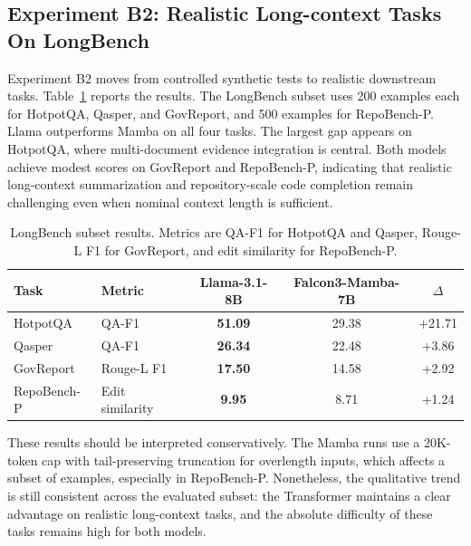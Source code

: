 \documentclass{article}
\begin{document}
\subsection{Experiment B2: Realistic Long-context Tasks On LongBench}
Experiment B2 moves from controlled synthetic tests to realistic downstream tasks. Table~\ref{tab:expb-longbench} reports the results. The LongBench subset uses 200 examples each for HotpotQA, Qasper, and GovReport, and 500 examples for RepoBench-P. Llama outperforms Mamba on all four tasks. The largest gap appears on HotpotQA, where multi-document evidence integration is central. Both models achieve modest scores on GovReport and RepoBench-P, indicating that realistic long-context summarization and repository-scale code completion remain challenging even when nominal context length is sufficient.

\begin{table}[t]
\centering
\begin{tabular}{llccc}
\toprule
Task & Metric & Llama-3.1-8B & Falcon3-Mamba-7B & $\Delta$ \\
\midrule
HotpotQA    & QA-F1           & \textbf{51.09} & 29.38 & +21.71 \\
Qasper      & QA-F1           & \textbf{26.34} & 22.48 & +3.86 \\
GovReport   & Rouge-L F1      & \textbf{17.50} & 14.58 & +2.92 \\
RepoBench-P & Edit similarity & \textbf{9.95}  & 8.71  & +1.24 \\
\bottomrule
\end{tabular}
\caption{LongBench subset results. Metrics are QA-F1 for HotpotQA and Qasper, Rouge-L F1 for GovReport, and edit similarity for RepoBench-P.}
\label{tab:expb-longbench}
\end{table}

These results should be interpreted conservatively. The Mamba runs use a 20K-token cap with tail-preserving truncation for overlength inputs, which affects a subset of examples, especially in RepoBench-P. Nonetheless, the qualitative trend is still consistent across the evaluated subset: the Transformer maintains a clear advantage on realistic long-context tasks, and the absolute difficulty of these tasks remains high for both models.
\end{document}
